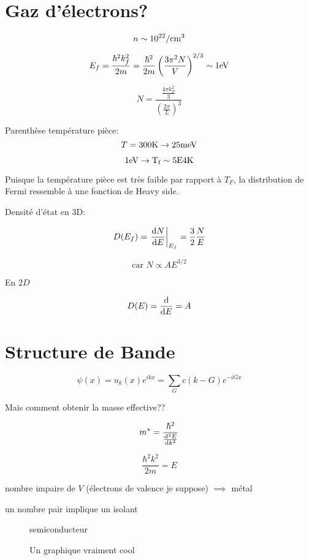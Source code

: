 


\section*{Gaz d'électrons?}


$$n \sim 10^{22} / \rm{cm}^3$$ 

$$E_f = \frac{\hbar^2k_f^{2}}{2m} =\frac{\hbar^2}{2m} \left( \frac{3\pi^2N}{V}   \right)^{2/3} \sim 1 \rm{eV} $$ 


$$N = \frac{\frac{4\pi{}k_F^{2}}{3}}{\left( \frac{2\pi}{L}  \right)^3}  $$ 


Parenthèse température pièce:
$$T = 300 \rm{K} \to 25 \rm{meV}$$ 

$$1 \rm{eV} \to T_f \sim 5E4 \rm{K}$$ 


Puisque la température pièce est très faible par rapport à $T_F$, la distribution de Fermi ressemble à une fonction de Heavy side.

Densité d'état en 3D:


$$D(E_f) = \eval{\dv{N}{E}}_{E_f} = \frac{3}{2} \frac{N}{E} $$ 

$$\text{car } N \propto A E^{3/2} $$ 

En $2D$

$$D(E) = \dv{{}}{E} (AE) = A$$ 


\section*{Structure de Bande}


$$\psi(x) = u_k(x)e^{ikx} = \sum_{G} c(k-G)e^{-iGx}$$ 

Mais comment obtenir la masse effective??

$$m^* = \frac{\hbar^2}{\dv[2]{E}{k}} $$ 

$$\frac{\hbar^2k^2}{2m} = E$$ 

nombre impaire de $V$ (électrons de valence je suppose) $\implies$ métal    

un nombre pair implique un isolant 



\begin{figure}[ht]
    \centering
    \caption{semiconducteur}
    \label{fig:semiconducteur}
\end{figure}


\begin{figure}[ht]
    \centering
    \caption{Un graphique vraiment cool}
    \label{fig:un-graphique-vraiment-cool}
\end{figure}

